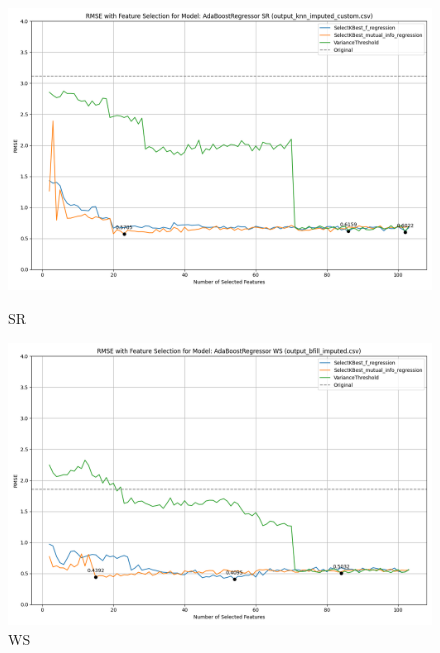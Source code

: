 \begin{figure}[H]
    \centering
    \begin{minipage}{0.45\textwidth}
        \centering
        \includegraphics[width=\linewidth]{reg_section_all/images_reg_featred_graphs/feature_selection_SR.png}
        \caption{SR}
        \label{fig:sr_reg_featred}
    \end{minipage}\hfill
    \begin{minipage}{0.45\textwidth}
        \centering
        \includegraphics[width=\linewidth]{reg_section_all/images_reg_featred_graphs/feature_selection_WS.png}
        \caption{WS}
        \label{fig:ws_reg_featred}
    \end{minipage}
\end{figure}

